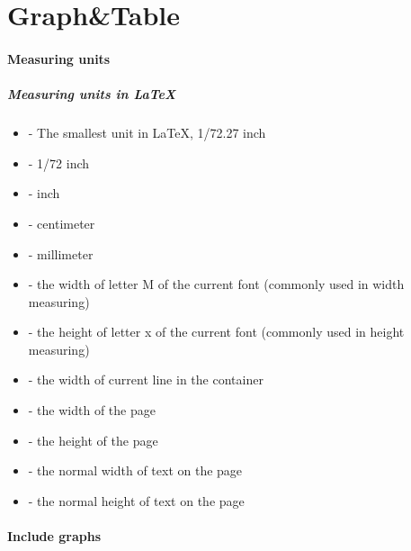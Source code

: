 \part{Graph&Table}

\subsection{Measuring units}

\begin{frame}
	\frametitle{Measuring units in \LaTeX}
	\begin{itemize}
		\item {} - The smallest unit in \LaTeX, 1/72.27 inch
		\item {} - 1/72 inch
		\item {} - inch
		\item {} - centimeter
		\item {} - millimeter
		\item {} - the width of letter M of the current font (commonly used in width measuring)
		\item {} - the height of letter x of the current font (commonly used in height measuring)
		\item {} - the width of current line in the container
		\item {} - the width of the page
		\item {} - the height of the page
		\item {} - the normal width of text on the page
		\item {} - the normal height of text on the page
	\end{itemize}
\end{frame}

\subsection{Include graphs}

